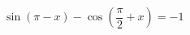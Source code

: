 \begin{ex}[type=equation]
	\begin{condition}
		$\ \sin {\left(\pi -x\right)} -\cos {\left(\dfrac{\pi }{2}+ x\right)} = -1$
	\end{condition}
\end{ex}